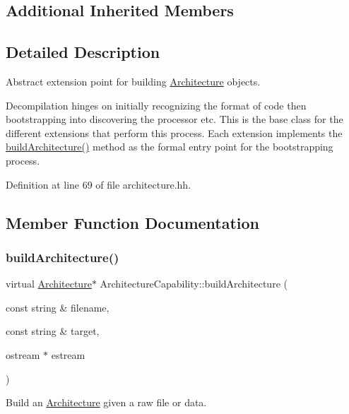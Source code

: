 \subsection*{Additional Inherited Members}


\subsection{Detailed Description}
Abstract extension point for building \mbox{\hyperlink{class_architecture}{Architecture}} objects. 

Decompilation hinges on initially recognizing the format of code then bootstrapping into discovering the processor etc. This is the base class for the different extensions that perform this process. Each extension implements the \mbox{\hyperlink{class_architecture_capability_a42e418206c4bcd9c0bc86d8ddfbf03e0}{build\+Architecture()}} method as the formal entry point for the bootstrapping process. 

Definition at line 69 of file architecture.\+hh.



\subsection{Member Function Documentation}
\mbox{\label{class_architecture_capability_a42e418206c4bcd9c0bc86d8ddfbf03e0}} 
\subsubsection{\texorpdfstring{buildArchitecture()}{buildArchitecture()}}
{\footnotesize\ttfamily virtual \mbox{\hyperlink{class_architecture}{Architecture}}$\ast$ Architecture\+Capability\+::build\+Architecture (\begin{DoxyParamCaption}\item[{const string \&}]{filename,  }\item[{const string \&}]{target,  }\item[{ostream $\ast$}]{estream }\end{DoxyParamCaption})\hspace{0.3cm}{\ttfamily [pure virtual]}}



Build an \mbox{\hyperlink{class_architecture}{Architecture}} given a raw file or data. 

